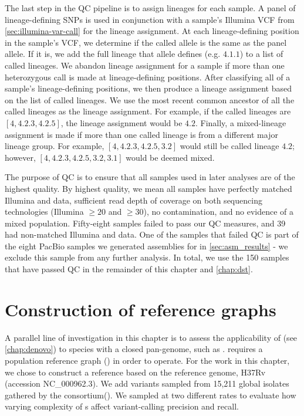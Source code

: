 The last step in the QC pipeline is to assign lineages for each sample. A panel of lineage-defining SNPs \cite{Shitikov2017,Rutaihwa2019,stucki2016} is used in conjunction with a sample's Illumina VCF from \autoref{sec:illumina-var-call} for the lineage assignment. At each lineage-defining position in the sample's VCF, we determine if the called allele is the same as the panel allele. If it is, we add the full lineage that allele defines (e.g. $4.1.1$) to a list of called lineages. We abandon lineage assignment for a sample if more than one heterozygous call is made at lineage-defining positions. After classifying all of a sample's lineage-defining positions, we then produce a lineage assignment based on the list of called lineages. We use the most recent common ancestor of all the called lineages as the lineage assignment. For example, if the called lineages are $[4, 4.2.3, 4.2.5]$, the lineage assignment would be $4.2$. Finally, a mixed-lineage assignment is made if more than one called lineage is from a different major lineage group. For example, $[4, 4.2.3, 4.2.5, 3.2]$ would still be called lineage $4.2$; however, $[4, 4.2.3, 4.2.5, 3.2, 3.1]$ would be deemed mixed.

The purpose of QC is to ensure that all samples used in later analyses are of the highest quality. By highest quality, we mean all samples have perfectly matched Illumina and \ont{} data, sufficient read depth of coverage on both sequencing technologies (Illumina $\ge 20$ and \ont{} $\ge 30$), no contamination, and no evidence of a mixed \mtb{} population. Fifty-eight samples failed to pass our QC measures, and 39 had non-matched Illumina and \ont{} data. One of the samples that failed QC is part of the eight PacBio samples we generated assemblies for in \autoref{sec:asm_results} - we exclude this sample from any further analysis. In total, we use the 150 samples that have passed QC in the remainder of this chapter and \autoref{chap:dst}.


\section{Construction of \mtb{} reference graphs}
\label{sec:tbprg}
A parallel line of investigation in this chapter is to assess the applicability of \pandora{} (see \autoref{chap:denovo}) to species with a closed pan-genome, such as \mtb{}. \pandora{} requires a population reference graph (\prg{}) in order to operate. For the work in this chapter, we chose to construct a reference \prg{} based on the \mtb{} reference genome, H37Rv (accession NC\_000962.3). We add variants sampled from 15,211 global \mtb{} isolates gathered by the \cryptic{} consortium(). We sampled at two different rates to evaluate how varying complexity of \prg{}s affect variant-calling precision and recall.

